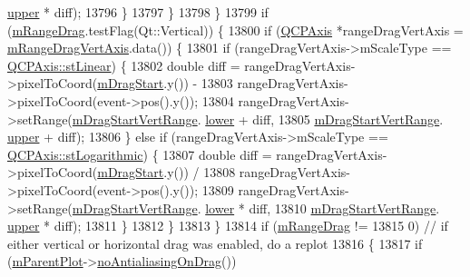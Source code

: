 \begin{DoxyCode}
      \hyperlink{class_q_c_p_range_ae44eb3aafe1d0e2ed34b499b6d2e074f}{upper} * diff);
13796         \}
13797       \}
13798     \}
13799     \textcolor{keywordflow}{if} (\hyperlink{class_q_c_p_axis_rect_aa9f107f66ca3469ad50ee6cea7c9e237}{mRangeDrag}.testFlag(Qt::Vertical)) \{
13800       \textcolor{keywordflow}{if} (\hyperlink{class_q_c_p_axis}{QCPAxis} *rangeDragVertAxis = \hyperlink{class_q_c_p_axis_rect_a3e41dffec18987366f2a8ffd80689c12}{mRangeDragVertAxis}.data()) \{
13801         \textcolor{keywordflow}{if} (rangeDragVertAxis->mScaleType == \hyperlink{class_q_c_p_axis_a36d8e8658dbaa179bf2aeb973db2d6f0aff6e30a11a828bc850caffab0ff994f6}{QCPAxis::stLinear}) \{
13802           \textcolor{keywordtype}{double} diff = rangeDragVertAxis->pixelToCoord(\hyperlink{class_q_c_p_axis_rect_a032896b28f83a58010d8d533b78c49df}{mDragStart}.y()) -
13803                         rangeDragVertAxis->pixelToCoord(event->pos().y());
13804           rangeDragVertAxis->setRange(\hyperlink{class_q_c_p_axis_rect_a1a5ae4c74b8bd46baf91bf4e4f4165f0}{mDragStartVertRange}.
      \hyperlink{class_q_c_p_range_aa3aca3edb14f7ca0c85d912647b91745}{lower} + diff,
13805                                       \hyperlink{class_q_c_p_axis_rect_a1a5ae4c74b8bd46baf91bf4e4f4165f0}{mDragStartVertRange}.
      \hyperlink{class_q_c_p_range_ae44eb3aafe1d0e2ed34b499b6d2e074f}{upper} + diff);
13806         \} \textcolor{keywordflow}{else} \textcolor{keywordflow}{if} (rangeDragVertAxis->mScaleType == \hyperlink{class_q_c_p_axis_a36d8e8658dbaa179bf2aeb973db2d6f0abf5b785ad976618816dc6f79b73216d4}{QCPAxis::stLogarithmic}) \{
13807           \textcolor{keywordtype}{double} diff = rangeDragVertAxis->pixelToCoord(\hyperlink{class_q_c_p_axis_rect_a032896b28f83a58010d8d533b78c49df}{mDragStart}.y()) /
13808                         rangeDragVertAxis->pixelToCoord(event->pos().y());
13809           rangeDragVertAxis->setRange(\hyperlink{class_q_c_p_axis_rect_a1a5ae4c74b8bd46baf91bf4e4f4165f0}{mDragStartVertRange}.
      \hyperlink{class_q_c_p_range_aa3aca3edb14f7ca0c85d912647b91745}{lower} * diff,
13810                                       \hyperlink{class_q_c_p_axis_rect_a1a5ae4c74b8bd46baf91bf4e4f4165f0}{mDragStartVertRange}.
      \hyperlink{class_q_c_p_range_ae44eb3aafe1d0e2ed34b499b6d2e074f}{upper} * diff);
13811         \}
13812       \}
13813     \}
13814     \textcolor{keywordflow}{if} (\hyperlink{class_q_c_p_axis_rect_aa9f107f66ca3469ad50ee6cea7c9e237}{mRangeDrag} !=
13815         0) \textcolor{comment}{// if either vertical or horizontal drag was enabled, do a replot}
13816     \{
13817       \textcolor{keywordflow}{if} (\hyperlink{class_q_c_p_layerable_aa2a528433e44db02b8aef23c1f9f90ed}{mParentPlot}->\hyperlink{class_q_custom_plot_ae07f2895a34d13a97a10cae4d8e17a36}{noAntialiasingOnDrag}())

\end{DoxyCode}
